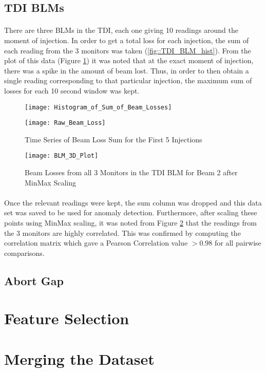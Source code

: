 \subsection{\acs{TDI} \acs{BLM}s}
\paragraph{ }There are three \acs{BLM}s in the \acs{TDI}, each one giving 10 readings around the moment of injection. In order to get a total loss for each injection, the sum of each reading from the 3 monitors was taken (\ref{fig::TDI_BLM_hist}). From the plot of this data (Figure \ref{fig::Raw_TDI_BLM}) it was noted that at the exact moment of injection, there was a spike in the amount of beam lost. Thus, in order to then obtain a single reading corresponding to that particular injection, the maximum sum of losses for each 10 second window was kept. 

\begin{figure}[!t]
	\begin{minipage}[b]{0.475\linewidth}
		\centering
		\texttt{[image: Histogram\_of\_Sum\_of\_Beam\_Losses]}
		\caption[BLM Histogram]{Histogram of Sum of Losses for Beam 1}
		\label{fig::TDI_BLM_hist}
	\end{minipage}	
	\hspace{0.25cm}
	\begin{minipage}[b]{0.475\linewidth}
		\centering
		\texttt{[image: Raw\_Beam\_Loss]}
		\caption[BLM Time Series]{Time Series of Beam Loss Sum for the First 5 Injections}
		\label{fig::Raw_TDI_BLM}
	\end{minipage}	
\end{figure}

\begin{figure}[b]
	\centering
	\texttt{[image: BLM\_3D\_Plot]}
	\caption[BLM Correlation Plot]{Beam Losses from all 3 Monitors in the TDI BLM for Beam 2 after MinMax Scaling}
	\label{fig::TDI_BLM_3D}
\end{figure}  

\paragraph{ }Once the relevant readings were kept, the sum column was dropped and this data set was saved to be used for anomaly detection. Furthermore, after scaling these points using MinMax scaling, it was noted from Figure \ref{fig::TDI_BLM_3D} that the readings from the 3 monitors are highly correlated. This was confirmed by computing the correlation matrix which gave a Pearson Correlation value $> 0.98$ for all pairwise comparisons.

\subsection{Abort Gap}

\section{Feature Selection}


\section{Merging the Dataset}
\label{sec::Merging_the_Dataset}